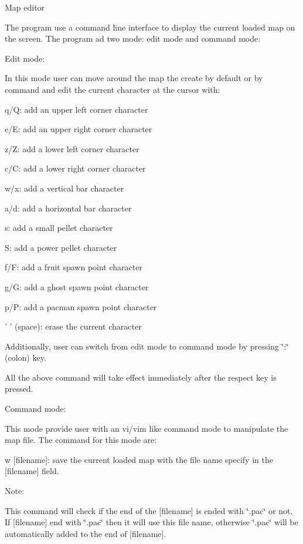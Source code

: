 \begin{DoxyEnumerate}
\item Map editor

The program use a command line interface to display the current loaded map on the screen. The program ad two mode\-: edit mode and command mode\-:

Edit mode\-:

In this mode user can move around the map the create by default or by command and edit the current character at the cursor with\-:

q/\-Q\-: add an upper left corner character

e/\-E\-: add an upper right corner character

z/\-Z\-: add a lower left corner character

c/\-C\-: add a lower right corner character

w/x\-: add a vertical bar character

a/d\-: add a horizontal bar character

s\-: add a small pellet character

S\-: add a power pellet character

f/\-F\-: add a fruit spawn point character

g/\-G\-: add a ghost spawn point character

p/\-P\-: add a pacman spawn point character

' ' (space)\-: erase the current character

Additionally, user can switch from edit mode to command mode by pressing \char`\"{}\-:\char`\"{} (colon) key.

All the above command will take effect immediately after the respect key is pressed.

Command mode\-:

This mode provide user with an vi/vim like command mode to manipulate the map file. The command for this mode are\-:

w \mbox{[}filename\mbox{]}\-: save the current loaded map with the file name specify in the \mbox{[}filename\mbox{]} field.

Note\-:

This command will check if the end of the \mbox{[}filename\mbox{]} is ended with \char`\"{}.\-pac\char`\"{} or not. If \mbox{[}filename\mbox{]} end with \char`\"{}.\-pac\char`\"{} then it will use this file name, otherwise \char`\"{}.\-pac\char`\"{} will be automatically added to the end of \mbox{[}filename\mbox{]}.


\end{DoxyEnumerate}
